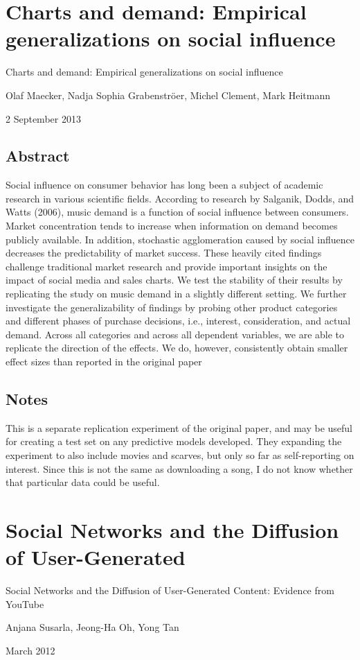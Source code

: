 \documentclass[12pt]{article}
\begin{document}
\section{Charts and demand: Empirical generalizations on social influence}
Charts and demand: Empirical generalizations on social influence\par

Olaf Maecker, Nadja Sophia Grabenströer, Michel Clement, Mark
Heitmann\par

2 September 2013\par

\subsection{Abstract}
Social influence on consumer behavior has long been a subject of
academic research in various scientific fields.  According to research
by Salganik, Dodds, and Watts (2006), music demand is a function of
social influence between consumers. Market concentration tends to
increase when information on demand becomes publicly available. In
addition, stochastic agglomeration caused by social influence
decreases the predictability of market success. These heavily cited
findings challenge traditional market research and provide important
insights on the impact of social media and sales charts. We test the
stability of their results by replicating the study on music demand in
a slightly different setting. We further investigate the
generalizability of findings by probing other product categories and
different phases of purchase decisions, i.e., interest, consideration,
and actual demand.  Across all categories and across all dependent
variables, we are able to replicate the direction of the effects.  We
do, however, consistently obtain smaller effect sizes than reported in
the original paper

\subsection{Notes}

This is a separate replication experiment of the original paper, and
may be useful for creating a test set on any predictive models
developed. They expanding the experiment to also include movies and
scarves, but only so far as self-reporting on interest. Since this is
not the same as downloading a song, I do not know whether that
particular data could be useful.


\section{Social Networks and the Diffusion of User-Generated}
Social Networks and the Diffusion of User-Generated
Content: Evidence from YouTube\par
Anjana Susarla, Jeong-Ha Oh, Yong Tan\par
March 2012\par
\end{document}
